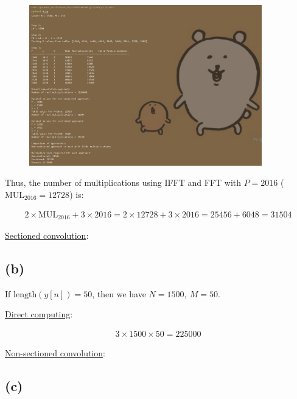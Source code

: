 \documentclass{article}
\begin{document}
\begin{figure}[H]
    \centering
    \includegraphics[width=0.9\textwidth]{HW5_img/4_a}
\end{figure}

Thus, the number of multiplications using IFFT and FFT with $P = 2016$ ($\mathrm{MUL}_{2016} = 12728$) is:

\begin{align*}
    2 \times \mathrm{MUL}_{2016} + 3 \times 2016 = 2 \times 12728 + 3 \times 2016 = 25456 + 6048 = 31504
\end{align*}

\underline{Sectioned convolution}:


\subsection*{(b)}

If $\mathrm{length}(y[n]) = 50$, then we have $N = 1500, \ M = 50$.
\bigskip

\underline{Direct computing}:

\begin{align*}
    3 \times 1500 \times 50 = 225000
\end{align*}

\underline{Non-sectioned convolution}:


\subsection*{(c)}
\end{document}
